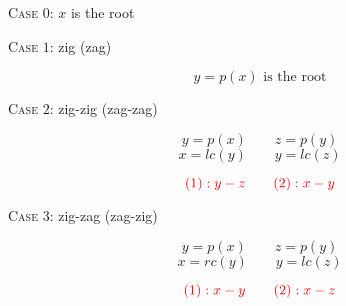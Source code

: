 \begin{frame}{}

  \vspace{0.30cm}
  \centerline{\textsc{Case $0$}: $x$ is the root}
\end{frame}

\begin{frame}{}

  \vspace{0.30cm}
  \centerline{\textsc{Case $1$}: zig (zag)}
  \[
    y = p(x) \text{ is the root}
  \]
\end{frame}

\begin{frame}{}

  \vspace{0.30cm}
  \centerline{\textsc{Case $2$}: zig-zig (zag-zag)}
  \[
    y = p(x) \qquad z = p(y)
  \]
  \[
    x = lc(y) \qquad y = lc(z)
  \]

  \pause
  \[
    \textcolor{red}{(1): y - z \qquad (2): x - y}
  \]
\end{frame}

\begin{frame}{}

  \vspace{0.30cm}
  \centerline{\textsc{Case $3$}: zig-zag (zag-zig)}
  \[
    y = p(x) \qquad z = p(y)
  \]
  \[
    x = rc(y) \qquad y = lc(z)
  \]

  \pause
  \[
    \textcolor{red}{(1): x - y \qquad (2): x - z}
  \]
\end{frame}

\begin{frame}{}
  \begin{columns}
      
  \end{columns}
\end{frame}

\begin{frame}{}

  \pause
\end{frame}

